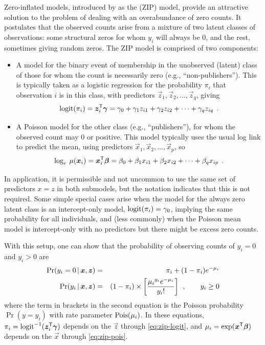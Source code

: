 \documentclass[11pt]{book}\usepackage[]{graphicx}\usepackage[]{color}
\begin{document}
Zero-inflated models, introduced by \citet{Lambert:1992} as the 
(ZIP) model, provide an attractive solution to the problem of dealing with an overabundance of
zero counts.  It postulates that the observed counts arise from a mixture of two latent classes
of observations: some structural zeros for whom $y_i$ will always be 0, and the rest, sometimes
giving random zeros.
The ZIP model is comprised of two components:
\begin{itemize}
  \item A model for the binary event of membership in the unobserved (latent) class of
  those for whom the count is necessarily zero (e.g., ``non-publishers'').
  This is typically taken as a logistic regression for the probability $\pi_i$ that
  observation $i$ is in this class, with predictors $\vec{z}_1, \vec{z}_2, \dots, \vec{z}_q$, giving
\begin{equation}\label{eq:zip-logit}
 \logit (\pi_i) = \vec{z}_i\trans \vec{\gamma}
                = \gamma_0 + \gamma_1 z_{i1} + \gamma_2 z_{i2} + \cdots + \gamma_q z_{iq} \period
\end{equation}

  \item A Poisson model for the other class (e.g., ``publishers''), for whom the observed count may 0 or
  positive. This model typically uses the usual log link to predict the mean, using predictors
  $\vec{x}_1, \vec{x}_2, \dots, \vec{x}_p$, so
\begin{equation}\label{eq:zip-pois}
  \log_e  \: \mu (\bm{x}_i) = \bm{x}_i ^\mathsf{T} \bm{\beta}
                 = \beta_0 + \beta_1 x_{i1} + \beta_2 x_{i2} + \cdots + \beta_q x_{ip} \:\: .
\end{equation}
\end{itemize}
In application, it is permissible and not uncommon to use the same set of predictors
$x = z$ in both submodels, but the notation indicates that this is not required.
Some simple special cases arise when the model for the always zero latent class
is an intercept-only model, $\logit (\pi_i) = \gamma_0$, implying the same probability
for all individuals, and (less commonly) when the Poisson mean model is intercept-only
with no predictors but there might be excess zero counts.

With this setup, one can show that the probability of observing counts of $y_i = 0$
and $y_i > 0$ are
\begin{eqnarray}
\Pr ({y_i} = 0 \, | \, \bm{x}, \bm{z}) &=& {\pi _i} + (1 - {\pi _i}){e^{ - {\mu _i}}} \label{eq:zip-probs} \\
\Pr ({y_i} \, | \, \bm{x}, \bm{z}) &=& (1 - {\pi _i}) \times \left[\frac{{{\mu _i}^{{y_i}}{e^{ - {\mu _i}}}}}{{{y_i}!}} \right] \:\: , \quad\quad y_i \ge 0 \nonumber
\end{eqnarray}
where the term in brackets in the second equation is the Poisson probability $\Pr(y=y_i)$
with rate parameter $\Pois(\mu_i)$. In these equations,
$\pi_i= \logit^{-1} (\vec{z}_i\trans \vec{\gamma}) $ depends on the $\vec{z}$ through \eqref{eq:zip-logit}, and
$\mu_i = \exp(\bm{x}^\mathsf{T}\bm{\beta})$ depends on the $\vec{x}$
through \eqref{eq:zip-pois}.
\end{document}
